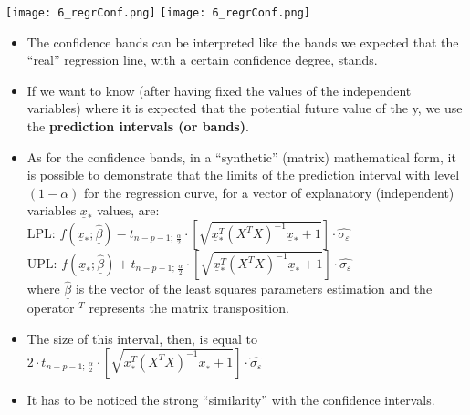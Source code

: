 \begin{frame}
  \begin{center}
    {\texttt{[image: 6\_regrConf.png]}}
    {\texttt{[image: 6\_regrConf.png]}}
  \end{center}
\end{frame}


\begin{frame}
  \vspace*{.5cm}
  \begin{itemize}
    \item The confidence bands can be interpreted like the bands we expected that the ``real'' regression line, with a certain confidence degree, stands.
    \vspace*{.75cm}
    \item If we want to know (after having fixed the values of the independent variables) where it is expected that the potential future value of the y, we use the \textbf{prediction intervals (or bands)}.
  \end{itemize}
\end{frame}

\begin{frame}
  \vspace*{.25cm}
  \begin{itemize}
    \item As for the confidence bands, in a ``synthetic'' (matrix) mathematical form, it is possible to demonstrate that the limits of the prediction interval with level $(1-\alpha)$ for the regression curve, for a vector of explanatory (independent) variables $\underline{x}_*$ values, are: \\
      \vspace*{.1cm}
      LPL: $f(\underline{x}_*;\hat{\underline{\beta}})-t_{n-p-1;\,\frac{\alpha}{2}}\cdot \left[\sqrt{\underline{x}_*^T(X^TX)^{-1}\underline{x}_*+1}\right]\cdot \hat{\sigma_\varepsilon}$ \\
      \vspace*{.1cm}
      UPL: $f(\underline{x}_*;\hat{\underline{\beta}})+t_{n-p-1;\,\frac{\alpha}{2}}\cdot \left[\sqrt{\underline{x}_*^T(X^TX)^{-1}\underline{x}_*+1}\right]\cdot \hat{\sigma_\varepsilon}$ \\
      \vspace*{.1cm}
      where $\hat{\underline{\beta}}$ is the vector of the least squares parameters estimation and the operator $^T$ represents the matrix transposition.
    \vspace*{.25cm}
    \item The size of this interval, then, is equal to $2\cdot t_{n-p-1;\,\frac{\alpha}{2}}\cdot \left[ \sqrt{\underline{x}_*^T(X^TX)^{-1}\underline{x}_*+1} \right]\cdot \hat{\sigma_\varepsilon}$
    \vspace*{.25cm}
    \item It has to be noticed the strong ``similarity'' with the confidence intervals.
  \end{itemize}
\end{frame}

